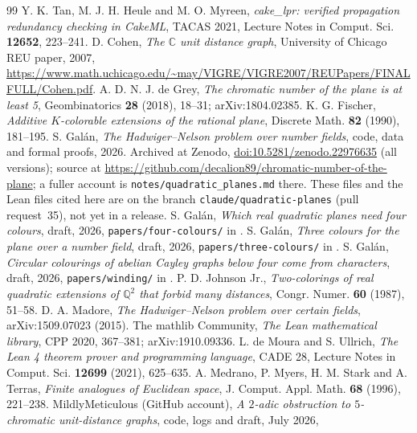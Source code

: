 \documentclass[11pt,a4paper]{amsart}
\theoremstyle{remark}
\newcommand{\Q}{\mathbb{Q}}
\newcommand{\C}{\mathbb{C}}
\begin{document}
\begin{thebibliography}{99}
 Y. K. Tan, M. J. H. Heule and M. O. Myreen, \emph{cake\_lpr: verified propagation redundancy
checking in CakeML}, TACAS 2021, Lecture Notes in Comput. Sci. \textbf{12652}, 223--241.
 D. Cohen, \emph{The $\C$ unit distance graph}, University of Chicago REU paper, 2007,
\url{https://www.math.uchicago.edu/~may/VIGRE/VIGRE2007/REUPapers/FINALFULL/Cohen.pdf}.
 A. D. N. J. de Grey, \emph{The chromatic number of the plane is at least 5}, Geombinatorics
\textbf{28} (2018), 18--31; arXiv:1804.02385.
 K. G. Fischer, \emph{Additive $K$-colorable extensions of the rational plane}, Discrete
Math. \textbf{82} (1990), 181--195.
 S. Gal\'an, \emph{The Hadwiger--Nelson problem over number fields}, code, data and formal
proofs, 2026. Archived at Zenodo, \href{https://doi.org/10.5281/zenodo.22976635}{doi:10.5281/zenodo.22976635}
(all versions); source at \url{https://github.com/decalion89/chromatic-number-of-the-plane}; a fuller account is
\texttt{notes/quadratic\_planes.md} there. These files and the Lean files cited here are on the branch
\texttt{claude/quadratic-planes} (pull request~35), not yet in a release.
 S. Gal\'an, \emph{Which real quadratic planes need four colours}, draft, 2026,
\texttt{papers/four-colours/} in \cite{Repo}.
 S. Gal\'an, \emph{Three colours for the plane over a number field}, draft, 2026,
\texttt{papers/three-colours/} in \cite{Repo}.
 S. Gal\'an, \emph{Circular colourings of abelian Cayley graphs below four come from
characters}, draft, 2026, \texttt{papers/winding/} in \cite{Repo}.
 P. D. Johnson Jr., \emph{Two-colorings of real quadratic extensions of $\Q^2$ that forbid
many distances}, Congr. Numer. \textbf{60} (1987), 51--58.
 D. A. Madore, \emph{The Hadwiger--Nelson problem over certain fields}, arXiv:1509.07023 (2015).
 The mathlib Community, \emph{The Lean mathematical library}, CPP 2020, 367--381;
arXiv:1910.09336.
 L. de Moura and S. Ullrich, \emph{The Lean 4 theorem prover and programming language}, CADE 28,
Lecture Notes in Comput. Sci. \textbf{12699} (2021), 625--635.
 A. Medrano, P. Myers, H. M. Stark and A. Terras, \emph{Finite analogues of Euclidean space},
  J. Comput. Appl. Math. \textbf{68} (1996), 221--238.
 MildlyMeticulous (GitHub account), \emph{A $2$-adic obstruction to $5$-chromatic unit-distance
graphs}, code, logs and draft, July 2026,

\end{thebibliography}
\end{document}
